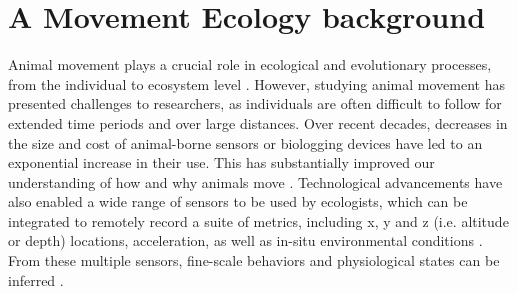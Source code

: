 \documentclass[a4paper,12pt]{article}
\begin{document}
	
	
	\newpage
	
	
	\section*{A Movement Ecology background}
	
	
	Animal movement plays a crucial role in ecological and evolutionary processes, from the individual to ecosystem level \citep{dingle_migration:_1996, clobert_dispersal_2001, nathan_movement_2008}. However, studying animal movement has presented challenges to researchers, as individuals are often difficult to follow for extended time periods and over large distances. Over recent decades, decreases in the size and cost of animal-borne sensors or biologging devices have led to an exponential increase in their use. This has substantially improved our understanding of how and why animals move \citep{nathan_movement_2008, kays_terrestrial_2015, hussey_aquatic_2015}. Technological advancements have also enabled a wide range of sensors to be used by ecologists, which can be integrated to remotely record a suite of metrics, including x, y and z (i.e. altitude or depth) locations, acceleration, as well as in-situ environmental conditions  \citep{wilson_prying_2008, cagnacci_animal_2010, wilmers_golden_2015}.
	From these multiple sensors, fine-scale behaviors and physiological states can be inferred \citep{rutz_new_2009, halsey_accelerometry_2009}. 
	
\end{document}
